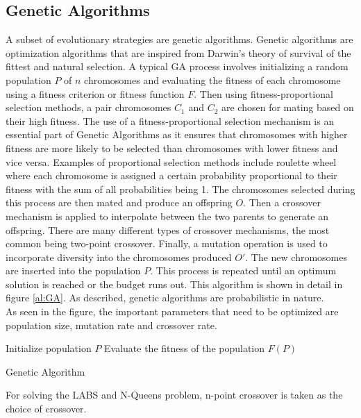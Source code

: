 \documentclass{article}
\begin{document}
\subsection{Genetic Algorithms}
A subset of evolutionary strategies are genetic algorithms. Genetic algorithms are optimization algorithms that are inspired from Darwin's theory of survival of the fittest and natural selection. A typical GA process involves initializing a random population $P$ of $n$ chromosomes and evaluating the fitness of each chromosome using a fitness criterion or fitness function $F$. Then using fitness-proportional selection methods, a pair chromosomes $C_1$ and $C_2$ are chosen for mating based on their high fitness. The use of a fitness-proportional selection mechanism is an essential part of Genetic Algorithms as it ensures that chromosomes with higher fitness are more likely to be selected than chromosomes with lower fitness and vice versa. Examples of proportional selection methods include roulette wheel where each chromosome is assigned a certain probability proportional to their fitness with the sum of all probabilities being 1. The chromosomes selected during this process are then mated and produce an offspring $O$. Then a crossover mechanism is applied to interpolate between the two parents to generate an offspring. There are many different types of crossover mechanisms, the most common being two-point crossover. Finally, a mutation operation is used to incorporate diversity into the chromosomes produced $O'$.  The new chromosomes are inserted into the population $P$. This process is repeated until an optimum solution is reached or the budget runs out. This algorithm is shown in detail in figure \ref{al:GA}. As described, genetic algorithms are probabilistic in nature. \\
As seen in the figure, the important parameters that need to be optimized are population size, mutation rate and crossover rate. \\

\begin{algorithm}[H]
\SetAlgoLined
{}

\BlankLine
Initialize population $P$\;
Evaluate the fitness of the population $F(P)$\;
\caption{Genetic Algorithm}\label{alg:GA}
\end{algorithm}
For solving the LABS and N-Queens problem,  n-point crossover is taken as the choice of crossover. 
\end{document}
